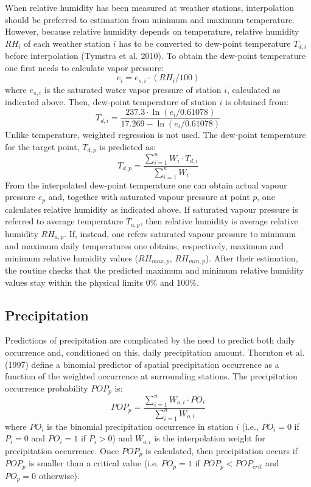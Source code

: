 \documentclass[11pt,a4paper]{article}
\begin{document}
When relative humidity has been measured at weather stations, interpolation should be preferred to estimation from minimum and maximum temperature. However, because relative humidity depends on temperature, relative humidity $RH_i$ of each weather station $i$ has to be converted to dew-point temperature $T_{d,i}$ before interpolation (Tymstra et al. 2010). To obtain the dew-point temperature one first needs to calculate vapor pressure:
\begin{equation}
e_i = e_{s,i} \cdot (RH_i / 100)
\end{equation}
where $e_{s,i}$ is the saturated water vapor pressure of station $i$, calculated as indicated above. Then, dew-point temperature of station $i$ is obtained from:
\begin{equation}
T_{d,i} = \frac{237.3\cdot \ln(e_i/0.61078)}{17.269 - \ln(e_i/0.61078)}
\end{equation}
Unlike temperature, weighted regression is not used. The dew-point temperature for the target point, $T_{d,p}$ is predicted as:
\begin{equation}
T_{d,p} = \frac{\sum_{i=1}^{n}{W_i\cdot T_{d,i}}}{\sum_{i=1}^{n}{W_i}}
\end{equation}
From the interpolated dew-point temperature one can obtain actual vapour pressure $e_{p}$ and, together with saturated vapour pressure at point $p$, one calculates relative humidity as indicated above. If saturated vapour pressure is referred to average temperature $T_{a,p}$, then relative humidity is average relative humidity $RH_{a,p}$. If, instead, one refers saturated vapour pressure to minimum and maximum daily temperatures one obtains, respectively, maximum and minimum relative humidity values ($RH_{max,p}$, $RH_{min,p}$). After their estimation, the routine checks that the predicted maximum and minimum relative humidity values stay within the physical limits 0\% and 100\%.


\subsection{Precipitation}
Predictions of precipitation are complicated by the need to predict both daily occurrence and, conditioned on this, daily precipitation amount. Thornton et al. (1997) define a binomial predictor of spatial precipitation occurrence as a function of the weighted occurrence at surrounding stations. The precipitation occurrence probability $POP_p$ is:
\begin{equation}
POP_p = \frac{\sum_{i=1}^{n}{W_{o,i}\cdot PO_i}}{\sum_{i=1}^{n}{W_{o,i}}}
\end{equation}
where $PO_i$ is the binomial precipitation occurrence in station $i$ (i.e., $PO_i = 0$ if $P_i = 0$ and $PO_i = 1$ if $P_i > 0$) and $W_{o,i}$ is the interpolation weight for precipitation occurrence. Once $POP_p$ is calculated, then precipitation occurs if $POP_p$ is smaller than a critical value (i.e. $PO_p = 1$ if $POP_p < POP_{crit}$ and $PO_p = 0$ otherwise). 
\end{document}
